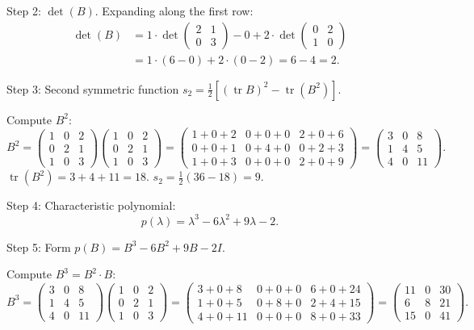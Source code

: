 \documentclass[12pt,a4paper]{article}
\begin{document}
Step 2: $\det(B)$. Expanding along the first row:
\begin{align*}
  \det(B) &= 1\cdot\det\begin{pmatrix}2&1\\0&3\end{pmatrix}
             - 0 + 2\cdot\det\begin{pmatrix}0&2\\1&0\end{pmatrix} \\
          &= 1\cdot(6-0) + 2\cdot(0-2) = 6 - 4 = 2.
\end{align*}

Step 3: Second symmetric function
$s_{2} = \tfrac{1}{2}[(\operatorname{tr}B)^{2}-\operatorname{tr}(B^{2})]$.

Compute $B^{2}$:
\[
  B^{2} = \begin{pmatrix} 1&0&2\\0&2&1\\1&0&3 \end{pmatrix}
          \begin{pmatrix} 1&0&2\\0&2&1\\1&0&3 \end{pmatrix}
        = \begin{pmatrix} 1+0+2 & 0+0+0 & 2+0+6 \\
                          0+0+1 & 0+4+0 & 0+2+3 \\
                          1+0+3 & 0+0+0 & 2+0+9 \end{pmatrix}
        = \begin{pmatrix} 3&0&8\\1&4&5\\4&0&11 \end{pmatrix}.
\]
$\operatorname{tr}(B^{2}) = 3+4+11 = 18$.
$s_{2} = \tfrac{1}{2}(36 - 18) = 9$.

Step 4: Characteristic polynomial:
\[
  p(\lambda) = \lambda^{3} - 6\lambda^{2} + 9\lambda - 2.
\]

Step 5: Form $p(B) = B^{3} - 6B^{2} + 9B - 2I$.

Compute $B^{3} = B^{2}\cdot B$:
\[
  B^{3} = \begin{pmatrix}3&0&8\\1&4&5\\4&0&11\end{pmatrix}
          \begin{pmatrix}1&0&2\\0&2&1\\1&0&3\end{pmatrix}
        = \begin{pmatrix}3+0+8&0+0+0&6+0+24\\1+0+5&0+8+0&2+4+15\\4+0+11&0+0+0&8+0+33\end{pmatrix}
        = \begin{pmatrix}11&0&30\\6&8&21\\15&0&41\end{pmatrix}.
\]
\end{document}
